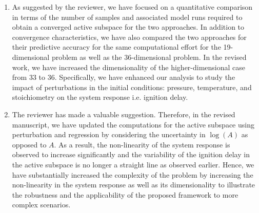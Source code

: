 \documentclass[11pt,final]{article}
\newcommand{\referee}[1]{\vspace{.1ex}\noindent{\textcolor{blue}{#1}}}
\begin{document}
\begin{enumerate}[wide, labelwidth=!, labelindent=0pt]
\item \referee{There is a lack of quantitative discussion of the expense of regression-vs-perturbation,
in terms of the actual number of model simulations required. The work seems to suggest that perturbation
works better than regression, but then it is a direct and clear consequence of the fact that local 
approximation is supposed to be better than a global one. Ideally, much more quantitative comparison
needs to be made here before reaching any meaningful conclusions.}

\noindent  As suggested by the reviewer, we have focused on a quantitative comparison in terms of the
number of samples and associated model runs required to obtain a converged active subspace
for the two approaches. In addition to convergence characteristics, we have also compared
the two approaches for their predictive accuracy for the same computational effort for the
19-dimensional problem as well as the 36-dimensional problem. In the revised work,
we have increased the dimensionality of
the higher-dimensional case from 33 to 36. Specifically, we have enhanced our analysis
to study the impact of perturbations in the initial conditions: pressure, temperature, and
stoichiometry on the system response i.e. ignition delay.

\item \referee{Another fundamental flaw is related to the additive treatment of the uncertainty of 
the pre-exponential factor A. In most works dealing with uncertainty in chemical kinetics, the
uncertainty form is multiplicative or, equivalently, log(A) is the underlying fundamental parameter 
with additive uncertainty range. In the current form of the uncertainty, the problem is too benign,
and barely carries any practical usability for the practitioners.}

\noindent The reviewer has made a valuable suggestion. Therefore, in the revised manuscript, we have
updated the computations for the active subspace using perturbation and regression by considering
the uncertainty in $\log(A)$ as opposed to $A$. As a result, the non-linearity of the system
response is observed to increase significantly and the variability of the ignition delay in the
active subspace is no longer a straight line as observed earlier. Hence, we have substantially
increased the complexity of the problem by increasing the non-linearity in the system response
as well as its dimensionality to illustrate the robustness and the applicability of the proposed framework
to more complex scenarios. 


\end{enumerate}
\end{document}
